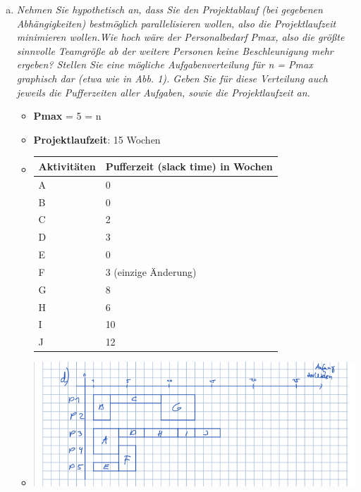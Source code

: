 \begin{enumerate}[(a)]
\newpage
    \item {\itshape Nehmen Sie hypothetisch an, dass Sie den Projektablauf (bei gegebenen Abhängigkeiten) bestmöglich parallelisieren wollen, also die Projektlaufzeit minimieren wollen.Wie hoch wäre der Personalbedarf Pmax, also die größte sinnvolle Teamgröße ab der weitere Personen keine Beschleunigung mehr ergeben? Stellen Sie eine mögliche Aufgabenverteilung für n = Pmax graphisch dar (etwa wie in Abb. 1). Geben Sie für diese Verteilung auch jeweils die Pufferzeiten aller Aufgaben, sowie die Projektlaufzeit an.}
        \begin{itemize}
            \item \textbf{Pmax} = 5 = n
            \item \textbf{Projektlaufzeit}: 15 Wochen
            \item[] \begin{tabular}{|l|l|}
                \hline
                \textbf{Aktivitäten} &  \textbf{Pufferzeit (slack time)} in Wochen\\ \hline  
                A & 0 \\ \hline 
                B & 0 \\ \hline 
                C & 2 \\ \hline 
                D & 3 \\ \hline 
                E & 0 \\ \hline 
                F & 3 (einzige Änderung) \\ \hline 
                G & 8 \\ \hline 
                H & 6 \\ \hline 
                I & 10 \\ \hline 
                J & 12\\ \hline 
            \end{tabular}
            
            \item[] \includegraphics[width=1\textwidth]{src/u12/task3/d.png} 
        \end{itemize}
    

\end{enumerate}
